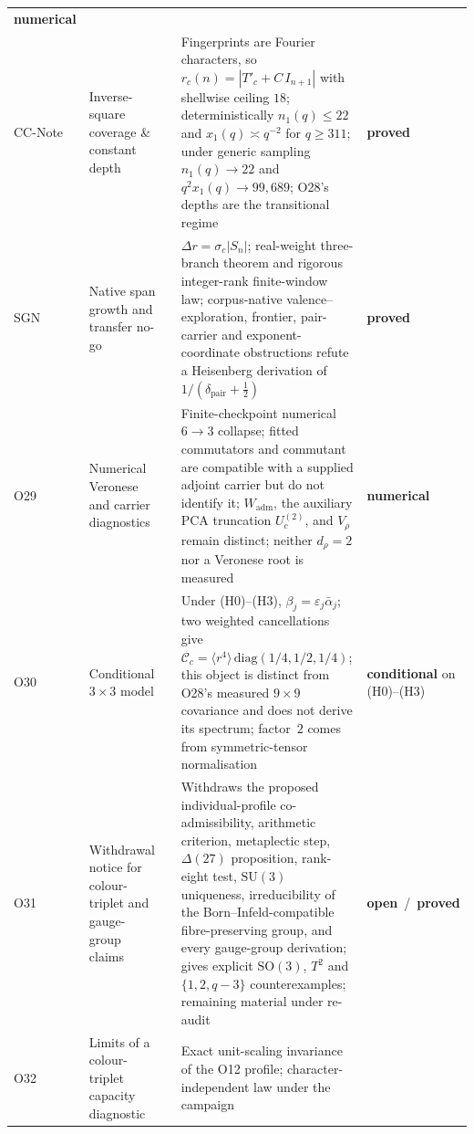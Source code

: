 \documentclass[11pt,a4paper]{article}
\newcommand{\SU}{\mathrm{SU}}
\newcommand{\sproved}{\textcolor{cproved}{\textbf{proved}}}
\newcommand{\sopen}{\textcolor{copen}{\textbf{open}}}
\newcommand{\snum}{\textcolor{cnum}{\textbf{numerical}}}
\newcommand{\scond}{\textcolor{ccond}{\textbf{conditional}}}
\begin{document}
\begin{longtable}{@{}p{1.70cm}p{2.9cm}p{1.3cm}p{6.25cm}>{\raggedright\arraybackslash}p{2.0cm}@{}}
      \snum \\[3pt]
      CC-Note & Inverse-square coverage \& constant depth & \cite{Beau2026ccnote} &
      Fingerprints are Fourier characters, so $r_c(n)=|T'_c+C\,I_{n+1}|$ with shellwise ceiling
      $18$; deterministically $n_1(q)\le22$ and $x_1(q)\asymp q^{-2}$ for $q\ge311$; under generic
      sampling $n_1(q)\to22$ and $q^2x_1(q)\to99{,}689$; O28's depths are the transitional regime &
      \sproved \\[3pt]
      SGN & Native span growth and transfer no-go & \cite{Beau2026sgn} &
      $\Delta r=\sigma_c|S_n|$; real-weight three-branch theorem and rigorous integer-rank
      finite-window law; corpus-native valence--exploration, frontier, pair-carrier and exponent-coordinate
      obstructions
      refute a Heisenberg derivation of $1/(\delta_{\mathrm{pair}}+\tfrac12)$ &
      \sproved \\[3pt]
      O29 & Numerical Veronese and carrier diagnostics & \cite{Beau2026a33} &
      Finite-checkpoint numerical $6\to3$ collapse; fitted commutators and commutant are compatible
      with a supplied adjoint carrier but do not identify it; $W_{\mathrm{adm}}$, the auxiliary PCA
      truncation $U_c^{(2)}$, and $V_\rho$ remain distinct; neither $d_\rho=2$ nor a Veronese root is
      measured &
      \snum \\[3pt]
      O30 & Conditional $3\times3$ model & \cite{Beau2026a34} &
      Under (H0)--(H3), $\beta_j=\varepsilon_j\bar\alpha_j$; two weighted cancellations give
      $\mathcal{C}_c = \langle r^4\rangle\,\mathrm{diag}(1/4,1/2,1/4)$;
      this object is distinct from O28's measured $9\times9$ covariance and does not derive its
      spectrum; factor~$2$ comes from symmetric-tensor normalisation &
      \scond{} on (H0)--(H3) \\[3pt]
      O31 & Withdrawal notice for colour-triplet and gauge-group claims & \cite{Beau2026a35} &
      Withdraws the proposed individual-profile co-admissibility, arithmetic criterion,
      metaplectic step, $\Delta(27)$ proposition, rank-eight test, $\SU(3)$ uniqueness, irreducibility of
      the Born--Infeld-compatible fibre-preserving group, and every gauge-group derivation; gives explicit
      $\mathrm{SO}(3)$, $T^2$ and
      $\{1,2,q-3\}$ counterexamples; remaining material under re-audit &
      \sopen\ /\ \sproved \\[3pt]
      O32 & Limits of a colour-triplet capacity diagnostic & \cite{Beau2026a36} &
      Exact unit-scaling invariance of the O12 profile; character-independent law under the campaign

\end{longtable}
\end{document}
